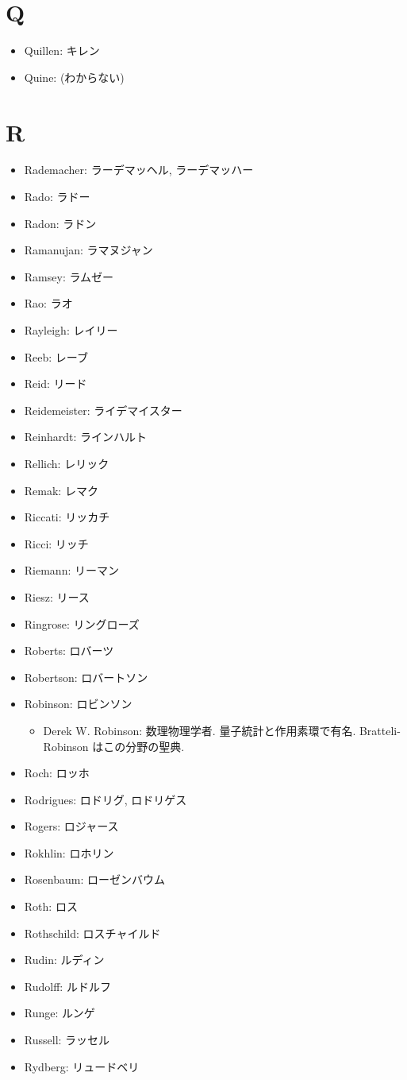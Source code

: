 \documentclass[openany, a4paper, oneside]{jsbook}
\begin{document}
\section{Q}

\begin{itemize}
\item Quillen: キレン
\item Quine: (わからない)
\end{itemize}
\section{R}

\begin{itemize}
\item Rademacher: ラーデマッヘル, ラーデマッハー
\item Rado: ラドー
\item Radon: ラドン
\item Ramanujan: ラマヌジャン
\item Ramsey: ラムゼー
\item Rao: ラオ
\item Rayleigh: レイリー
\item Reeb: レーブ
\item Reid: リード
\item Reidemeister: ライデマイスター
\item Reinhardt: ラインハルト
\item Rellich: レリック
\item Remak: レマク
\item Riccati: リッカチ
\item Ricci: リッチ
\item Riemann: リーマン
\item Riesz: リース
\item Ringrose: リングローズ
\item Roberts: ロバーツ
\item Robertson: ロバートソン
\item Robinson: ロビンソン
\begin{itemize}
\item Derek W. Robinson: 数理物理学者. 量子統計と作用素環で有名. Bratteli-Robinson はこの分野の聖典.
\end{itemize}
\item Roch: ロッホ
\item Rodrigues: ロドリグ, ロドリゲス
\item Rogers: ロジャース
\item Rokhlin: ロホリン
\item Rosenbaum: ローゼンバウム
\item Roth: ロス
\item Rothschild: ロスチャイルド
\item Rudin: ルディン
\item Rudolff: ルドルフ
\item Runge: ルンゲ
\item Russell: ラッセル
\item Rydberg: リュードベリ
\end{itemize}
\end{document}
